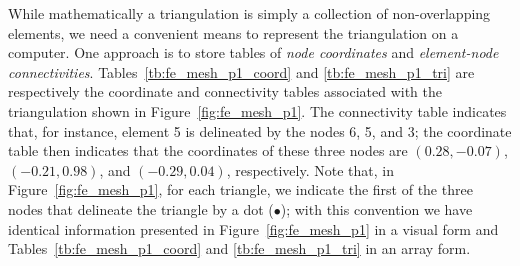 While mathematically a triangulation is simply a collection of non-overlapping elements, we need a convenient means to represent the triangulation on a computer.  One approach is to store tables of \emph{node coordinates} and \emph{element-node connectivities}.  Tables~\ref{tb:fe_mesh_p1_coord} and \ref{tb:fe_mesh_p1_tri} are respectively the coordinate and connectivity tables associated with the triangulation shown in Figure~\ref{fig:fe_mesh_p1}. The connectivity table indicates that, for instance, element 5 is delineated by the nodes 6, 5, and 3; the coordinate table then indicates that the coordinates of these three nodes are $(0.28,-0.07)$, $(-0.21,0.98)$, and $(-0.29,0.04)$, respectively.  Note that, in Figure~\ref{fig:fe_mesh_p1}, for each triangle, we indicate the first of the three nodes that delineate the triangle by a dot ($\bullet$); with this convention we have identical information presented in Figure~\ref{fig:fe_mesh_p1} in a visual form and Tables~\ref{tb:fe_mesh_p1_coord} and \ref{tb:fe_mesh_p1_tri} in an array form.

\begin{table}
  \centering
  \caption{Node coordinate and connectivity table for mesh shown in Figure~\ref{fig:fe_mesh_p1}.  \label{tb:fe_mesh_p1}}
\end{table}

